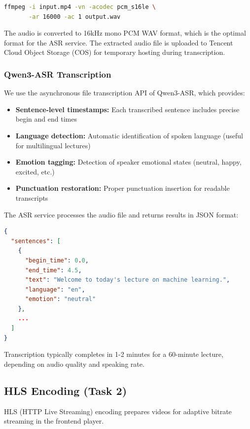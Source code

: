 \documentclass[12pt,a4paper]{article}
\begin{document}
\begin{lstlisting}[language=bash, caption={Audio Extraction Command}]
ffmpeg -i input.mp4 -vn -acodec pcm_s16le \
       -ar 16000 -ac 1 output.wav
\end{lstlisting}

The audio is converted to 16kHz mono PCM WAV format, which is the optimal format for the ASR service. The extracted audio file is uploaded to Tencent Cloud Object Storage (COS) for temporary hosting during transcription.

\subsubsection{Qwen3-ASR Transcription}

We use the asynchronous file transcription API of Qwen3-ASR, which provides:

\begin{itemize}
    \item \textbf{Sentence-level timestamps:} Each transcribed sentence includes precise begin and end times
    \item \textbf{Language detection:} Automatic identification of spoken language (useful for multilingual lectures)
    \item \textbf{Emotion tagging:} Detection of speaker emotional states (neutral, happy, excited, etc.)
    \item \textbf{Punctuation restoration:} Proper punctuation insertion for readable transcripts
\end{itemize}

The ASR service processes the audio file and returns results in JSON format:

\begin{lstlisting}[language=json, caption={ASR Response Format}]
{
  "sentences": [
    {
      "begin_time": 0.0,
      "end_time": 4.5,
      "text": "Welcome to today's lecture on machine learning.",
      "language": "en",
      "emotion": "neutral"
    },
    ...
  ]
}
\end{lstlisting}

Transcription typically completes in 1-2 minutes for a 60-minute lecture, depending on audio quality and speaking rate.

\subsection{HLS Encoding (Task 2)}

HLS (HTTP Live Streaming) encoding prepares videos for adaptive bitrate streaming in the frontend player.
\end{document}
